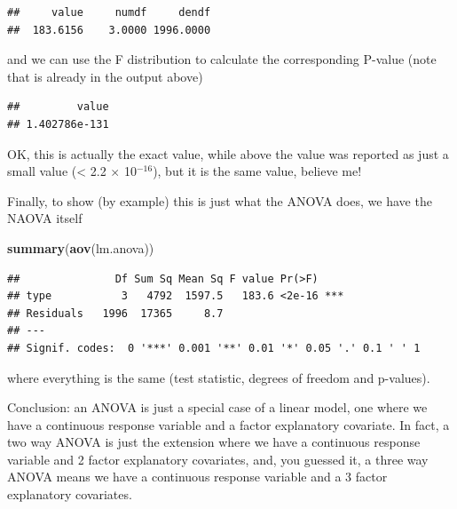 \documentclass[
]{book}
\newenvironment{Shaded}{\begin{snugshade}}{\end{snugshade}}
\newcommand{\DecValTok}[1]{\textcolor[rgb]{0.00,0.00,0.81}{#1}}
\newcommand{\KeywordTok}[1]{\textcolor[rgb]{0.13,0.29,0.53}{\textbf{#1}}}
\newcommand{\NormalTok}[1]{#1}
\newcommand{\OperatorTok}[1]{\textcolor[rgb]{0.81,0.36,0.00}{\textbf{#1}}}
\begin{document}
\begin{verbatim}
##     value     numdf     dendf 
##  183.6156    3.0000 1996.0000
\end{verbatim}

and we can use the F distribution to calculate the corresponding P-value (note that is already in the output above)

\begin{Shaded}
\end{Shaded}

\begin{verbatim}
##         value 
## 1.402786e-131
\end{verbatim}

OK, this is actually the exact value, while above the value was reported as just a small value (\textless{} 2.2 \(\times\) 10\(^{-16}\)), but it is the same value, believe me!

Finally, to show (by example) this is just what the ANOVA does, we have the NAOVA itself

\begin{Shaded}
\begin{Highlighting}[]
\KeywordTok{summary}\NormalTok{(}\KeywordTok{aov}\NormalTok{(lm.anova))}
\end{Highlighting}
\end{Shaded}

\begin{verbatim}
##               Df Sum Sq Mean Sq F value Pr(>F)    
## type           3   4792  1597.5   183.6 <2e-16 ***
## Residuals   1996  17365     8.7                   
## ---
## Signif. codes:  0 '***' 0.001 '**' 0.01 '*' 0.05 '.' 0.1 ' ' 1
\end{verbatim}

where everything is the same (test statistic, degrees of freedom and p-values).

Conclusion: an ANOVA is just a special case of a linear model, one where we have a continuous response variable and a factor explanatory covariate. In fact, a two way ANOVA is just the extension where we have a continuous response variable and 2 factor explanatory covariates, and, you guessed it, a three way ANOVA means we have a continuous response variable and a 3 factor explanatory covariates.
\end{document}
